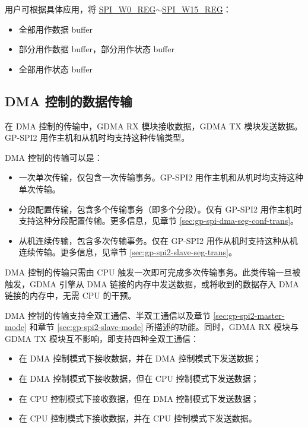 \documentclass[main\_\_CN.tex]{subfiles}
\begin{document}
用户可根据具体应用，将 \hyperref[regdesc:SPIW0REG]{SPI\_W0\_REG}$\sim$\hyperref[regdesc:SPIW15REG]{SPI\_W15\_REG}：
\begin{itemize}
    \item 全部用作数据 buffer
    \item 部分用作数据 buffer，部分用作状态 buffer
    \item 全部用作状态 buffer
\end{itemize}



\subsection{DMA 控制的数据传输}\label{sec:usage-of-gp-spi2-dma-controlled-mode}
在 DMA 控制的传输中，GDMA RX 模块接收数据，GDMA TX 模块发送数据。GP-SPI2 用作主机和从机时均支持这种传输类型。

DMA 控制的传输可以是：

\begin{itemize}
    \item 一次单次传输，仅包含一次传输事务。GP-SPI2 用作主机和从机时均支持这种单次传输。
    \item 分段配置传输，包含多个传输事务（即多个分段）。仅有 GP-SPI2 用作主机时支持这种分段配置传输。更多信息，见章节  \ref{sec:gp-spi-dma-seg-conf-trans}。
    \item 从机连续传输，包含多次传输事务。仅在 GP-SPI2 用作从机时支持这种从机连续传输。更多信息，见章节  \ref{sec:gp-spi2-slave-seg-trans}。
\end{itemize}

DMA 控制的传输只需由 CPU 触发一次即可完成多次传输事务。此类传输一旦被触发，GDMA 引擎从 DMA 链接的内存中发送数据，或将收到的数据存入 DMA 链接的内存中，无需 CPU 的干预。

DMA 控制的传输支持全双工通信、半双工通信以及章节 \ref{sec:gp-spi2-master-mode} 和章节 \ref{sec:gp-spi2-slave-mode} 所描述的功能。同时，GDMA RX 模块与 GDMA TX 模块互不影响，即支持四种全双工通信：

\begin{itemize}
    \item 在 DMA 控制模式下接收数据，并在 DMA 控制模式下发送数据；

    \item 在 DMA 控制模式下接收数据，但在 CPU 控制模式下发送数据；

    \item 在 CPU 控制模式下接收数据，但在 DMA 控制模式下发送数据；

    \item 在 CPU 控制模式下接收数据，并在 CPU 控制模式下发送数据。

\end{itemize}
\end{document}
